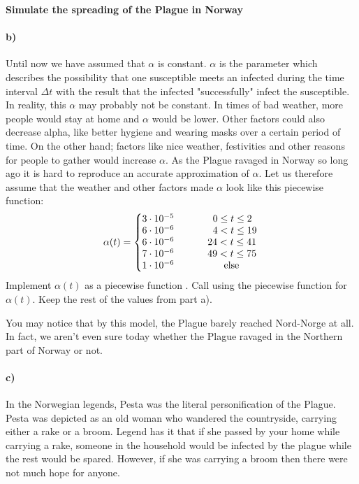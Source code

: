 \begin{Problem}{\textbf{Simulate the spreading of the Plague in Norway}}
\paragraph{b)}
Until now we have assumed that $\alpha$ is constant. $\alpha$ is the parameter which describes the possibility that one susceptible meets an infected during the time interval $\Delta t$ with the result that the infected "successfully" infect the susceptible. In reality, this $\alpha$ may probably not be constant. In times of bad weather, more people would stay at home and $\alpha$ would be lower. Other factors could also decrease alpha, like better hygiene and wearing masks over a certain period of time. On the other hand; factors like nice weather, festivities and other reasons for people to gather would increase $\alpha$.
As the Plague ravaged in Norway so long ago it is hard to reproduce an accurate approximation of $\alpha$. Let us therefore assume that the weather and other factors made $\alpha$ look like this piecewise function:
\[
  \alpha(t) = \left\{
     \begin{array}{@{}l@{\thinspace}l}
      3 \cdot 10^{-5}  \hspace*{14mm}  0 \leq t \leq 2 \\
      6 \cdot 10^{-6} \hspace*{14mm} 4 < t \leq 19 \\
      6 \cdot 10^{-6} \hspace*{12.1mm} 24 < t \leq 41 \\
      7 \cdot 10^{-6}  \hspace{12.1mm} 49 < t \leq 75\\
      1 \cdot 10^{-6} \hspace{18mm} \text{else}
     \end{array}
   \right.
\]
Implement $\alpha(t)$ as a piecewise function . Call  using the piecewise function for $\alpha (t)$. Keep the rest of the values from part a).

You may notice that by this model, the Plague barely reached Nord-Norge at all. In fact, we aren't even sure today whether the Plague ravaged in the Northern part of Norway or not.

\paragraph{c)}

In the Norwegian legends, Pesta was the literal personification of the Plague. Pesta was depicted as an old woman who wandered the countryside, carrying either a rake or a broom. Legend has it that if she passed by your home while carrying a rake,  someone in the household would be infected by the plague while the rest would be spared. However, if she was carrying a broom then there were not much hope for anyone.


\end{Problem}
